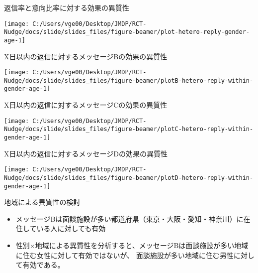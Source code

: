 \documentclass[
      aspectratio=169,
        12pt,
    ]{beamer}
\providecommand{\tightlist}{%
  \setlength{\itemsep}{0pt}\setlength{\parskip}{0pt}}
\begin{document}
\begin{frame}{返信率と意向比率に対する効果の異質性}
\protect\hypertarget{ux8fd4ux4fe1ux7387ux3068ux610fux5411ux6bd4ux7387ux306bux5bfeux3059ux308bux52b9ux679cux306eux7570ux8ceaux6027}{}
\begin{center}\texttt{[image: C:/Users/vge00/Desktop/JMDP/RCT-Nudge/docs/slide/slides\_files/figure-beamer/plot-hetero-reply-gender-age-1]} \end{center}
\end{frame}

\begin{frame}{X日以内の返信に対するメッセージBの効果の異質性}
\protect\hypertarget{xux65e5ux4ee5ux5185ux306eux8fd4ux4fe1ux306bux5bfeux3059ux308bux30e1ux30c3ux30bbux30fcux30b8bux306eux52b9ux679cux306eux7570ux8ceaux6027}{}
\begin{center}\texttt{[image: C:/Users/vge00/Desktop/JMDP/RCT-Nudge/docs/slide/slides\_files/figure-beamer/plotB-hetero-reply-within-gender-age-1]} \end{center}
\end{frame}

\begin{frame}{X日以内の返信に対するメッセージCの効果の異質性}
\protect\hypertarget{xux65e5ux4ee5ux5185ux306eux8fd4ux4fe1ux306bux5bfeux3059ux308bux30e1ux30c3ux30bbux30fcux30b8cux306eux52b9ux679cux306eux7570ux8ceaux6027}{}
\begin{center}\texttt{[image: C:/Users/vge00/Desktop/JMDP/RCT-Nudge/docs/slide/slides\_files/figure-beamer/plotC-hetero-reply-within-gender-age-1]} \end{center}
\end{frame}

\begin{frame}{X日以内の返信に対するメッセージDの効果の異質性}
\protect\hypertarget{xux65e5ux4ee5ux5185ux306eux8fd4ux4fe1ux306bux5bfeux3059ux308bux30e1ux30c3ux30bbux30fcux30b8dux306eux52b9ux679cux306eux7570ux8ceaux6027}{}
\begin{center}\texttt{[image: C:/Users/vge00/Desktop/JMDP/RCT-Nudge/docs/slide/slides\_files/figure-beamer/plotD-hetero-reply-within-gender-age-1]} \end{center}
\end{frame}

\begin{frame}{地域による異質性の検討}
\protect\hypertarget{ux5730ux57dfux306bux3088ux308bux7570ux8ceaux6027ux306eux691cux8a0e}{}
\begin{itemize}
\tightlist
\item
  メッセージBは面談施設が多い都道府県（東京・大阪・愛知・神奈川）に在住している人に対しても有効
\item
  性別×地域による異質性を分析すると、メッセージBは面談施設が多い地域に住む女性に対して有効ではないが、
  面談施設が多い地域に住む男性に対して有効である。
\end{itemize}
\end{frame}
\end{document}
